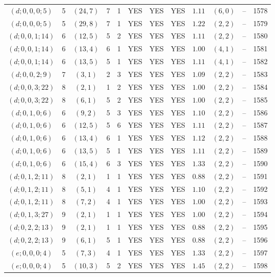 \begin{longtable}{|c|c|c|c|c|c|c|c|c|c|c|c|}
$(d;0,0,0;5)$ & 5 & $(24,7)$ & 7 & 1 & YES & YES & YES & $1.11$ & $(6,0)$ & -- & 1578\\
$(d;0,0,0;5)$ & 5 & $(29,8)$ & 7 & 1 & YES & YES & YES & $1.22$ & $(2,2)$ & -- & 1579\\
$(d;0,0,1;14)$ & 6 & $(12,5)$ & 5 & 2 & YES & YES & YES & $1.11$ & $(2,2)$ & -- & 1580\\
$(d;0,0,1;14)$ & 6 & $(13,4)$ & 6 & 1 & YES & YES & YES & $1.00$ & $(4,1)$ & -- & 1581\\
$(d;0,0,1;14)$ & 6 & $(13,5)$ & 5 & 1 & YES & YES & YES & $1.11$ & $(4,1)$ & -- & 1582\\
$(d;0,0,2;9)$ & 7 & $(3,1)$ & 2 & 3 & YES & YES & YES & $1.09$ & $(2,2)$ & -- & 1583\\
$(d;0,0,3;22)$ & 8 & $(2,1)$ & 1 & 2 & YES & YES & YES & $1.00$ & $(2,2)$ & -- & 1584\\
$(d;0,0,3;22)$ & 8 & $(6,1)$ & 5 & 2 & YES & YES & YES & $1.00$ & $(2,2)$ & -- & 1585\\
$(d;0,1,0;6)$ & 6 & $(9,2)$ & 5 & 3 & YES & YES & YES & $1.10$ & $(2,2)$ & -- & 1586\\
$(d;0,1,0;6)$ & 6 & $(12,5)$ & 5 & 6 & YES & YES & YES & $1.11$ & $(2,2)$ & -- & 1587\\
$(d;0,1,0;6)$ & 6 & $(13,4)$ & 6 & 1 & YES & YES & YES & $1.12$ & $(2,2)$ & -- & 1588\\
$(d;0,1,0;6)$ & 6 & $(13,5)$ & 5 & 1 & YES & YES & YES & $1.11$ & $(2,2)$ & -- & 1589\\
$(d;0,1,0;6)$ & 6 & $(15,4)$ & 6 & 3 & YES & YES & YES & $1.33$ & $(2,2)$ & -- & 1590\\
$(d;0,1,2;11)$ & 8 & $(2,1)$ & 1 & 1 & YES & YES & YES & $0.88$ & $(2,2)$ & -- & 1591\\
$(d;0,1,2;11)$ & 8 & $(5,1)$ & 4 & 1 & YES & YES & YES & $1.10$ & $(2,2)$ & -- & 1592\\
$(d;0,1,2;11)$ & 8 & $(7,2)$ & 4 & 1 & YES & YES & YES & $1.00$ & $(2,2)$ & -- & 1593\\
$(d;0,1,3;27)$ & 9 & $(2,1)$ & 1 & 1 & YES & YES & YES & $1.00$ & $(2,2)$ & -- & 1594\\
$(d;0,2,2;13)$ & 9 & $(2,1)$ & 1 & 1 & YES & YES & YES & $0.88$ & $(2,2)$ & -- & 1595\\
$(d;0,2,2;13)$ & 9 & $(6,1)$ & 5 & 1 & YES & YES & YES & $0.88$ & $(2,2)$ & -- & 1596\\
$(e;0,0,0;4)$ & 5 & $(7,3)$ & 4 & 1 & YES & YES & YES & $1.33$ & $(2,2)$ & -- & 1597\\
$(e;0,0,0;4)$ & 5 & $(10,3)$ & 5 & 2 & YES & YES & YES & $1.45$ & $(2,2)$ & -- & 1598\\

\end{longtable}

